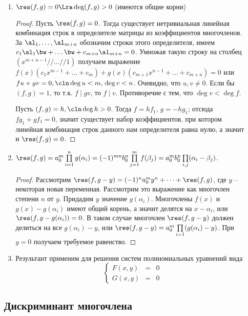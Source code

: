 \begin{enumerate}
  \item $\res(f,g)=0 \Lra \deg(f,g)>0$ (имеются общие корни)
    \begin{proof}
      Пусть $\res(f,g)=0$. Тогда существует нетривиальная линейная
      комбинация строк в определителе матрицы из коэффициентов
      многочленов. За $\al_1,\dots,\al_{m+n}$ обозначим строки этого
      определителя, имеем
      $c_1\al_1\bw+\dots\bw+c_{m+n}\al_{m+n}=0$. Умножая такую строку
      на столбец $(x^{m+n-1} // \dots // 1)$ получаем выражение
      $f(x)(c_1x^{m-1}+\dots+c_m)+g(x)(c_{m+1}x^{n-1}+\dots+c_{m+n})=0$
      или $fu+gv=0,\cln\deg u<m,\,\deg v<n$. Очевидно, что
      $u,v\ne0$. Если бы $(f,g)=1$, то т.к. $f\mid gv$, то $f\mid
      v$. Противоречие с тем, что $\deg v<\deg f$.

      Пусть $(f,g)=h,\cln \deg h>0$. Тогда $f=hf_1$, $g=-hg_1$; отсюда $fg_1+gf_1=0$, значит существует набор коэффициентов, при котором линейная комбинация строк данного нам определителя равна нулю, а значит и $\res(f,g)=0$.
    \end{proof}
  \item $\res(f,g)=a_0^m\prod\limits_{i=1}^n g(\alpha_i)=(-1)^{mn}b_0^n\prod\limits_{j=1}^m f(\beta_j)=a_0^mb_0^n\prod\limits_{i,j}(\alpha_i-\beta_j)$.
    \begin{proof}
      Рассмотрим $\res(f,g-y)=(-1)^na_0^my^n+\dots+\res(f,g)$, где $y$ -- некоторая новая переменная. Рассмотрим это выражение как многочлен степени $n$ от $y$. Придадим $y$ значение $g(\alpha_i)$. Многочлены $f(x)$ и $g(x)-g(\alpha_i)$ имеют общий корень, а значит делятся на $x-\alpha_i$, или $\res(f,g-g(\alpha_i))=0$. В таком случае многочлен $\res(f,g-y)$ должен делиться на все $g(\alpha_i)-y$, или $\res(f,g-y)=a_0^m\prod\limits_{i=1}(g(\alpha_i)-y)$. При $y=0$ получаем требуемое равенство.
    \end{proof}
  \item Результант применим для решения систем полиномиальных уравнений вида
    $$
      \left\{\begin{array}{lcl}
        F(x,y) &=& 0\\
        G(x,y) &=& 0
      \end{array}\right.
    $$
\end{enumerate}

\subsection{Дискриминант многочлена}

